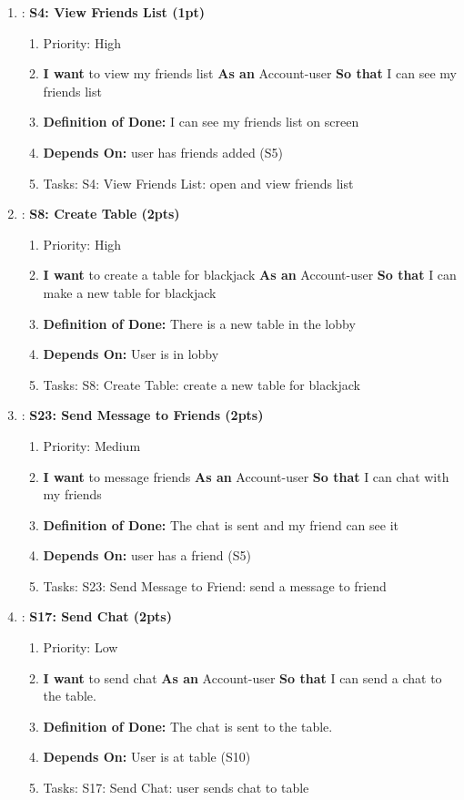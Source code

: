 \begin{enumerate}
    \item: \textbf{S4: View Friends List (1pt)}
    \begin{enumerate}
        \item Priority: High 
        \item \textbf{I want} to view my friends list \textbf{As an} Account-user \textbf{So that} I can see my friends list
        \item \textbf{Definition of Done:} I can see my friends list on screen
        \item \textbf{Depends On:} user has friends added (S5)
        \item Tasks: S4: View Friends List: open and view friends list
    \end{enumerate}

    \item: \textbf{S8: Create Table (2pts)}
    \begin{enumerate}
        \item Priority: High 
        \item \textbf{I want} to create a table for blackjack \textbf{As an} Account-user \textbf{So that} I can make a new table for blackjack
        \item \textbf{Definition of Done:} There is a new table in the lobby
        \item \textbf{Depends On:} User is in lobby
        \item Tasks: S8: Create Table: create a new table for blackjack
    \end{enumerate}

    \item: \textbf{S23: Send Message to Friends (2pts)}
    \begin{enumerate}
        \item Priority: Medium
        \item \textbf{I want} to message friends \textbf{As an} Account-user \textbf{So that} I can chat with my friends
        \item \textbf{Definition of Done:} The chat is sent and my friend can see it
        \item \textbf{Depends On:} user has a friend (S5)
        \item Tasks: S23: Send Message to Friend: send a message to friend
    \end{enumerate}

    \item: \textbf{S17: Send Chat (2pts)}
    \begin{enumerate}
        \item Priority: Low
        \item \textbf{I want} to send chat \textbf{As an} Account-user \textbf{So that} I can send a chat to the table.
        \item \textbf{Definition of Done:} The chat is sent to the table.
        \item \textbf{Depends On:} User is at table (S10)
        \item Tasks: S17: Send Chat: user sends chat to table
    \end{enumerate}


\end{enumerate}
